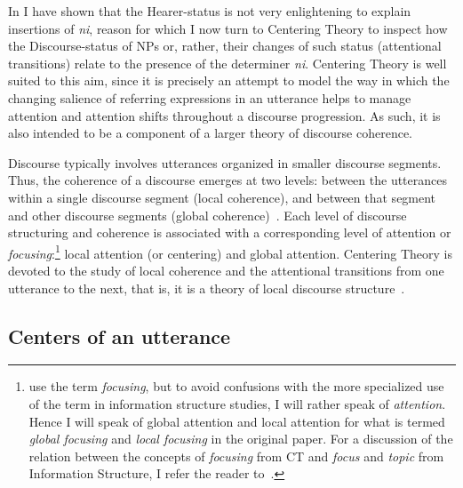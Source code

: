 \documentclass[output=paper
,modfonts
,nonflat]{langsci/langscibook}
\begin{document}
In  I have shown that the Hearer-status is not very enlightening to explain insertions of \textit{ni}, reason for which I now turn to Centering Theory to inspect how the Discourse-status of NPs or, rather, their changes of such status (attentional transitions) relate to the presence of the determiner \textit{ni}. Centering Theory is well suited to this aim, since it is precisely an attempt to model the way in which the changing salience of referring expressions in an utterance helps to manage attention and attention shifts throughout a discourse progression. As such, it is also intended to be a component of a larger theory of discourse coherence.

Discourse typically involves utterances organized in smaller discourse segments. Thus, the coherence of a discourse emerges at two levels: between the utterances within a single discourse segment (local coherence), and between that segment and other discourse segments (global coherence)~\citep[44]{GroszEtAlii1983}. Each level of discourse structuring and coherence is associated with a corresponding level of attention or \textit{focusing}:\footnote{\citet[44]{GroszEtAlii1983} use the term \textit{focusing}, but to avoid confusions with the more specialized use of the term in information structure studies, I will rather speak of \textit{attention}. Hence I will speak of global attention and local attention for what is termed \textit{global focusing} and \textit{local focusing} in the original paper. For a discussion of the relation between the concepts of \textit{focusing} from CT and \textit{focus} and \textit{topic} from Information Structure, I refer the reader to~\citet[][279, footnote 10]{GundelEtAlii1993}.} local attention (or centering) and global attention.
Centering Theory is devoted to the study of local coherence and the attentional transitions from one utterance to the next, that is, it is a theory of local discourse structure~\citep{GroszEtAlii1995,GroszSidner1998,WalkerEtAlii1998}. 


\subsection{Centers of an utterance}\label{sec:pico:3.2}
\end{document}
